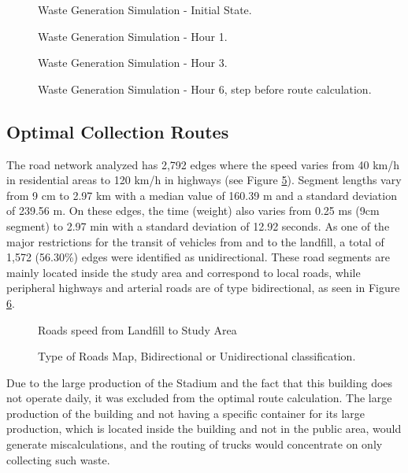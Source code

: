 \documentclass[authoryear,preprint,review,12pt]{elsarticle}
\begin{document}
    \begin{figure}
        \caption{Waste Generation Simulation - Initial State.}
        \label{fig:Sim1}
    \end{figure}

    \begin{figure}
        \caption{Waste Generation Simulation - Hour 1.}
        \label{fig:Sim2}
    \end{figure}

    \begin{figure}
        \caption{Waste Generation Simulation - Hour 3.}
        \label{fig:Sim3}
    \end{figure}

    \begin{figure}
        \caption{Waste Generation Simulation - Hour 6, step before route calculation.}
        \label{fig:Sim4}
    \end{figure}

    \subsection{Optimal Collection Routes}\label{subs:Optimalroute}
    The road network analyzed has 2,792 edges where the speed varies from 40 km/h in residential areas to 120 km/h in highways (see Figure \ref{fig:road1}). Segment lengths vary from 9 cm to 2.97 km with a median value of 160.39 m and a standard deviation of 239.56 m. On these edges, the time (weight) also varies from 0.25 ms (9cm segment) to 2.97 min with a standard deviation of 12.92 seconds. As one of the major restrictions for the transit of vehicles from and to the landfill, a total of 1,572 (56.30\%) edges were identified as unidirectional. These road segments are mainly located inside the study area and correspond to local roads, while peripheral highways and arterial roads are of type bidirectional, as seen in Figure \ref{fig:road2}.

    \begin{figure}
        \caption{Roads speed from Landfill to Study Area}
        \label{fig:road1}
    \end{figure}

    \begin{figure}
        \caption{Type of Roads Map, Bidirectional or Unidirectional classification.}
        \label{fig:road2}
    \end{figure}

    Due to the large production of the Stadium and the fact that this building does not operate daily, it was excluded from the optimal route calculation. The large production of the building and not having a specific container for its large production, which is located inside the building and not in the public area, would generate miscalculations, and the routing of trucks would concentrate on only collecting such waste.
\end{document}
